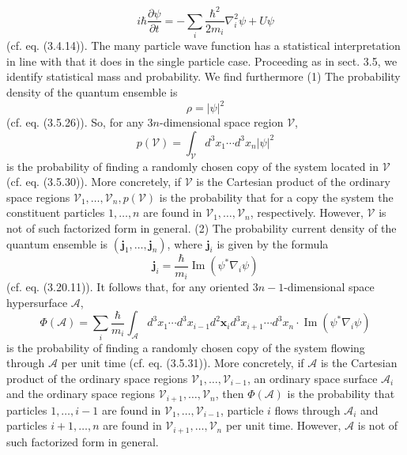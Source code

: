 \documentclass{article}
\begin{document}
$$
\begin{equation*}
i \hbar \frac{\partial \psi}{\partial t}=-\sum_{i} \frac{\hbar^{2}}{2 m_{i}} \nabla_{i}^{2} \psi+U \psi \tag{3.20.8}
\end{equation*}
$$
(cf. eq. (3.4.14)). The many particle wave function has a statistical interpretation in line with that it does in the single particle case. Proceeding as in sect. 3.5, we identify statistical mass and probability. We find furthermore
(1) The probability density of the quantum ensemble is
$$
\begin{equation*}
\rho=|\psi|^{2} \tag{3.20.9}
\end{equation*}
$$
(cf. eq. (3.5.26)). So, for any $3 n$-dimensional space region $\mathcal{V}$,
$$
\begin{equation*}
p(\mathcal{V})=\int_{\mathcal{V}} d^{3} x_{1} \cdots d^{3} x_{n}|\psi|^{2} \tag{3.20.10}
\end{equation*}
$$
is the probability of finding a randomly chosen copy of the system located in $\mathcal{V}$
(cf. eq. (3.5.30)). More concretely, if $\mathcal{V}$ is the Cartesian product of the ordinary space regions $\mathcal{V}_{1}, \ldots, \mathcal{V}_{n}, p(\mathcal{V})$ is the probability that for a copy the system the constituent particles $1, \ldots, n$ are found in $\mathcal{V}_{1}, \ldots, \mathcal{V}_{n}$, respectively. However, $\mathcal{V}$ is not of such factorized form in general.
(2) The probability current density of the quantum ensemble is $\left(\boldsymbol{j}_{1}, \ldots, \boldsymbol{j}_{n}\right)$, where $\boldsymbol{j}_{i}$ is given by the formula
$$
\begin{equation*}
\boldsymbol{j}_{i}=\frac{\hbar}{m_{i}} \operatorname{Im}\left(\psi^{*} \nabla_{i} \psi\right) \tag{3.20.11}
\end{equation*}
$$
(cf. eq. (3.20.11)). It follows that, for any oriented $3 n-1$-dimensional space hypersurface $\mathcal{A}$,
$$
\begin{equation*}
\Phi(\mathcal{A})=\sum_{i} \frac{\hbar}{m_{i}} \int_{\mathcal{A}} d^{3} x_{1} \cdots d^{3} x_{i-1} d^{2} \boldsymbol{x}_{i} d^{3} x_{i+1} \cdots d^{3} x_{n} \cdot \operatorname{Im}\left(\psi^{*} \nabla_{i} \psi\right) \tag{3.20.12}
\end{equation*}
$$
is the probability of finding a randomly chosen copy of the system flowing through $\mathcal{A}$ per unit time (cf. eq. (3.5.31)). More concretely, if $\mathcal{A}$ is the Cartesian product of the ordinary space regions $\mathcal{V}_{1}, \ldots, \mathcal{V}_{i-1}$, an ordinary space surface $\mathcal{A}_{i}$ and the ordinary space regions $\mathcal{V}_{i+1}, \ldots, \mathcal{V}_{n}$, then $\Phi(\mathcal{A})$ is the probability that particles $1, \ldots, i-1$ are found in $\mathcal{V}_{1}, \ldots, \mathcal{V}_{i-1}$, particle $i$ flows through $\mathcal{A}_{i}$ and particles $i+1, \ldots, n$ are found in $\mathcal{V}_{i+1}, \ldots, \mathcal{V}_{n}$ per unit time. However, $\mathcal{A}$ is not of such factorized form in general.
\end{document}
